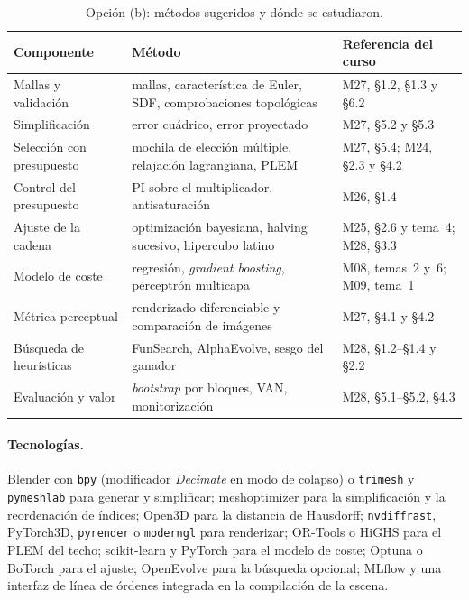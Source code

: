 \begin{table}[H]
\centering\small
\caption{Opción (b): métodos sugeridos y dónde se estudiaron.}\label{tab:metodos-b}
\begin{tabularx}{\textwidth}{@{}>{\raggedright\arraybackslash}p{3.6cm}>{\raggedright\arraybackslash}X>{\raggedright\arraybackslash}p{3.8cm}@{}}
\toprule
Componente & Método & Referencia del curso \\
\midrule
Mallas y validación & mallas, característica de Euler, SDF, comprobaciones topológicas & M27, §1.2, §1.3 y §6.2 \\
Simplificación & error cuádrico, error proyectado & M27, §5.2 y §5.3 \\
Selección con presupuesto & mochila de elección múltiple, relajación lagrangiana, PLEM & M27, §5.4; M24, §2.3 y §4.2 \\
Control del presupuesto & PI sobre el multiplicador, antisaturación & M26, §1.4 \\
Ajuste de la cadena & optimización bayesiana, halving sucesivo, hipercubo latino & M25, §2.6 y tema~4; M28, §3.3 \\
Modelo de coste & regresión, \emph{gradient boosting}, perceptrón multicapa & M08, temas~2 y~6; M09, tema~1 \\
Métrica perceptual & renderizado diferenciable y comparación de imágenes & M27, §4.1 y §4.2 \\
Búsqueda de heurísticas & FunSearch, AlphaEvolve, sesgo del ganador & M28, §1.2--§1.4 y §2.2 \\
Evaluación y valor & \emph{bootstrap} por bloques, VAN, monitorización & M28, §5.1--§5.2, §4.3 \\
\bottomrule
\end{tabularx}
\end{table}

\paragraph{Tecnologías.} Blender con \texttt{bpy} (modificador \emph{Decimate} en modo de colapso) o \texttt{trimesh} y \texttt{pymeshlab} para generar y simplificar; meshoptimizer para la simplificación y la reordenación de índices; Open3D para la distancia de Hausdorff; \texttt{nvdiffrast}, PyTorch3D, \texttt{pyrender} o \texttt{moderngl} para renderizar; OR-Tools o HiGHS para el PLEM del techo; scikit-learn y PyTorch para el modelo de coste; Optuna o BoTorch para el ajuste; OpenEvolve para la búsqueda opcional; MLflow y una interfaz de línea de órdenes integrada en la compilación de la escena.

